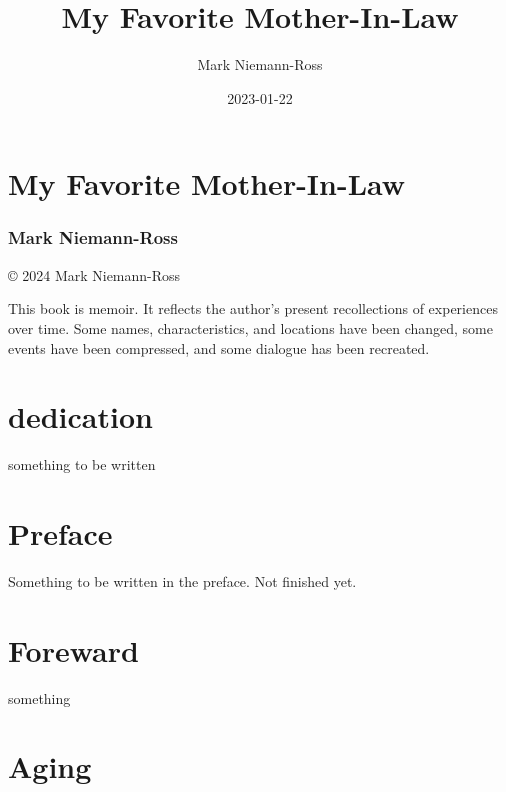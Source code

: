 \documentclass[
  letterpaper,
  DIV=11,
  numbers=noendperiod]{scrreprt}
\title{My Favorite Mother-In-Law}
\author{Mark Niemann-Ross}
\date{2023-01-22}
\renewcommand*\contentsname{Table of contents}
\newcommand\contentsname{Table of contents}
\begin{document}
\maketitle

\renewcommand*\contentsname{Table of contents}
{
\hypersetup{linkcolor=}
\setcounter{tocdepth}{2}
\tableofcontents
}

\chapter{My Favorite Mother-In-Law}\label{my-favorite-mother-in-law}

\subsection{Mark Niemann-Ross}\label{mark-niemann-ross}

© 2024 Mark Niemann-Ross

This book is memoir. It reflects the author's present recollections of
experiences over time. Some names, characteristics, and locations have
been changed, some events have been compressed, and some dialogue has
been recreated.


\chapter{dedication}\label{dedication}

something to be written


\chapter{Preface}\label{preface}

Something to be written in the preface. Not finished yet.


\chapter{Foreward}\label{foreward}

something


\chapter*{Aging}\label{aging}
\end{document}
